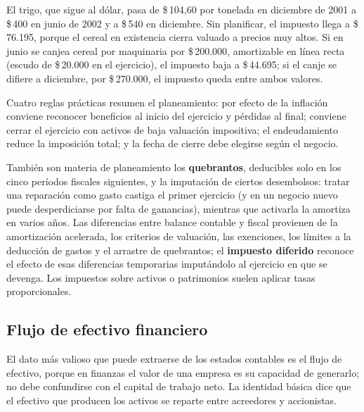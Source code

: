 \begin{ejemplo}
El trigo, que sigue al dólar, pasa de \$\,104,60 por tonelada en diciembre de 2001 a \$\,400 en junio de 2002 y a \$\,540 en diciembre. Sin planificar, el impuesto llega a \$\,76.195, porque el cereal en existencia cierra valuado a precios muy altos. Si en junio se canjea cereal por maquinaria por \$\,200.000, amortizable en línea recta (escudo de \$\,20.000 en el ejercicio), el impuesto baja a \$\,44.695; si el canje se difiere a diciembre, por \$\,270.000, el impuesto queda entre ambos valores.
\end{ejemplo}

Cuatro reglas prácticas resumen el planeamiento: por efecto de la inflación conviene reconocer beneficios al inicio del ejercicio y pérdidas al final; conviene cerrar el ejercicio con activos de baja valuación impositiva; el endeudamiento reduce la imposición total; y la fecha de cierre debe elegirse según el negocio.

También son materia de planeamiento los \textbf{quebrantos}, deducibles solo en los cinco períodos fiscales siguientes, y la imputación de ciertos desembolsos: tratar una reparación como gasto castiga el primer ejercicio (y en un negocio nuevo puede desperdiciarse por falta de ganancias), mientras que activarla la amortiza en varios años. Las diferencias entre balance contable y fiscal provienen de la amortización acelerada, los criterios de valuación, las exenciones, los límites a la deducción de gastos y el arrastre de quebrantos; el \textbf{impuesto diferido} reconoce el efecto de esas diferencias temporarias imputándolo al ejercicio en que se devenga. Los impuestos sobre activos o patrimonios suelen aplicar tasas proporcionales.

\subsection{Flujo de efectivo financiero}\label{sec:u2-feA}

El dato más valioso que puede extraerse de los estados contables es el flujo de efectivo, porque en finanzas el valor de una empresa es su capacidad de generarlo; no debe confundirse con el capital de trabajo neto. La identidad básica dice que el efectivo que producen los activos se reparte entre acreedores y accionistas.

